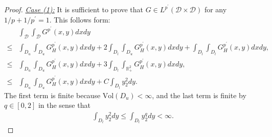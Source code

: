 \documentclass[10pt,a4paper]{amsart}
\newcommand{\D}{\mathcal{D}}
\newcommand{\R}{\mathbb{R}}
\renewcommand{\tt}[1]{\text{#1}}
\begin{document}
\begin{proof}
    \underline{\textit{Case (1):}} It is sufficient to prove that $G\in L^{p^\prime}(\D \times \D)$ for any $1/p+1/p^{\prime}=1$. This follows form:
    \begin{align*}
        & \int_{\D}\int_{\D}G^{p^{\prime}}(x,y)dxdy 
        \\
        \leq & \int_{D_u}\int_{D_u}G_H^{p^{\prime}}(x,y)dxdy + 2\int_{D_l}\int_{D_u}G_H^{p^{\prime}}(x,y)dxdy + \int_{D_l}\int_{D_l}G_H^{p^{\prime}}(x,y)dxdy, \\
        \leq & \int_{D_u}\int_{D_u}G_H^{p^{\prime}}(x,y)dxdy + 3\int_{D_l}\int_{\R^2_+}G_H^{p^{\prime}}(x,y)dxdy, \\
        \leq & \int_{D_u}\int_{D_u}G_H^{p^{\prime}}(x,y)dxdy + C\int_{D_l}y_2^2dy.
    \end{align*}
    The first term is finite because $\tt{Vol}(D_u)<\infty$, and the last term is finite by $q\in[0,2]$ in the sense that 
    \begin{align*}
        \int_{D_l}y_2^2 dy \leq \int_{D_l}y_2^q dy <\infty.
    \end{align*}
    

\end{proof}
\end{document}
